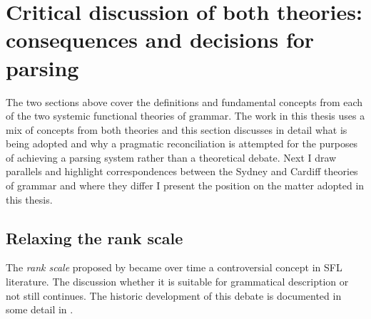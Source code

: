 \section{Critical discussion of both theories: consequences and decisions for parsing} 
\label{sec:critical-on-two-theories}
    The two sections above cover the definitions and fundamental concepts from each of the two systemic functional theories of grammar. The work in this thesis uses a mix of concepts from both theories and this section discusses in detail what is being adopted and why a pragmatic reconciliation is attempted for the purposes of achieving a parsing system rather than a theoretical debate. Next I draw parallels and highlight correspondences between the Sydney and Cardiff theories of grammar and where they differ I present the position on the matter adopted in this thesis.

\subsection{Relaxing the rank scale}
\label{sec:rank-system}
    
    The \textit{rank scale} proposed by \citet{Halliday2002} became over time a controversial concept in SFL literature. The discussion whether it is suitable for grammatical description or not still continues. The historic development of this debate is documented in some detail in \citet[309--338]{Fawcett2000}. %
    
    
    
